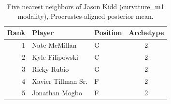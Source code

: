 \begin{table}[htbp]
  \centering\small
  \begin{tabular}{rllc}
    \toprule
    Rank & Player & Position & Archetype \\
    \midrule
    1 & Nate McMillan & G & 2 \\
    2 & Kyle Filipowski & C & 2 \\
    3 & Ricky Rubio & G & 2 \\
    4 & Xavier Tillman Sr. & F & 2 \\
    5 & Jonathan Mogbo & F & 2 \\
    \bottomrule
  \end{tabular}
  \caption{Five nearest neighbors of Jason Kidd (curvature_m1 modality), Procrustes-aligned posterior mean.}
  \label{tab:Jason_Kidd_neighbors_curvature_m1}
\end{table}


